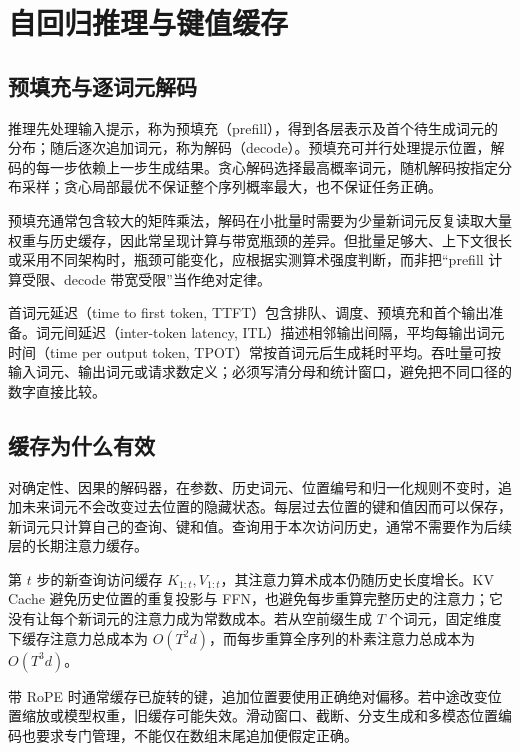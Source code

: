 \setcounter{chapter}{21} %
\chapter{自回归推理与键值缓存}
\label{ch:inference}

\section{预填充与逐词元解码}

推理先处理输入提示，称为预填充（prefill），得到各层表示及首个待生成词元的分布；随后逐次追加词元，称为解码（decode）。预填充可并行处理提示位置，解码的每一步依赖上一步生成结果。贪心解码选择最高概率词元，随机解码按指定分布采样；贪心局部最优不保证整个序列概率最大，也不保证任务正确。

预填充通常包含较大的矩阵乘法，解码在小批量时需要为少量新词元反复读取大量权重与历史缓存，因此常呈现计算与带宽瓶颈的差异。但批量足够大、上下文很长或采用不同架构时，瓶颈可能变化，应根据实测算术强度判断，而非把“prefill 计算受限、decode 带宽受限”当作绝对定律。

首词元延迟（time to first token, TTFT）包含排队、调度、预填充和首个输出准备。词元间延迟（inter-token latency, ITL）描述相邻输出间隔，平均每输出词元时间（time per output token, TPOT）常按首词元后生成耗时平均。吞吐量可按输入词元、输出词元或请求数定义；必须写清分母和统计窗口，避免把不同口径的数字直接比较。

\section{缓存为什么有效}

对确定性、因果的解码器，在参数、历史词元、位置编号和归一化规则不变时，追加未来词元不会改变过去位置的隐藏状态。每层过去位置的键和值因而可以保存，新词元只计算自己的查询、键和值。查询用于本次访问历史，通常不需要作为后续层的长期注意力缓存。

第 $t$ 步的新查询访问缓存 $K_{1:t},V_{1:t}$，其注意力算术成本仍随历史长度增长。KV Cache 避免历史位置的重复投影与 FFN，也避免每步重算完整历史的注意力；它没有让每个新词元的注意力成为常数成本。若从空前缀生成 $T$ 个词元，固定维度下缓存注意力总成本为 $O(T^2d)$，而每步重算全序列的朴素注意力总成本为 $O(T^3d)$。

带 RoPE 时通常缓存已旋转的键，追加位置要使用正确绝对偏移。若中途改变位置缩放或模型权重，旧缓存可能失效。滑动窗口、截断、分支生成和多模态位置编码也要求专门管理，不能仅在数组末尾追加便假定正确。

